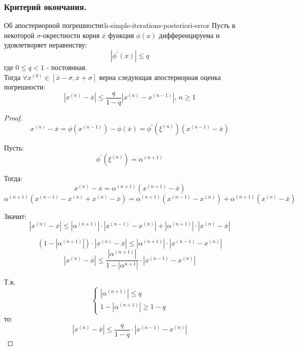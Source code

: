 \documentclass[14pt]{extarticle}
\begin{document}
    \subsubsection{Критерий окончания.}
        
        \begin{theorem}{Об апостериорной погрешности}{th-simple-iterations-posteriori-error}
            Пусть в некоторой $\sigma$-окрестности корня $\overline{x}$ функция $\phi(x)$ дифференцируема и удовлетворяет неравенству:
            $$|\phi^{'}(x)| \leq q$$
            где $0 \leq q < 1$ - постоянная.\\

            Тогда $\forall x^{(0)} \in [\overline{x} - \sigma, \overline{x} + \sigma]$ верна следующая апостериорная оценка погрешности:
            $$|x^{(n)} - \overline{x}| \leq \frac{q}{1 - q} |x^{(n)} - x^{(n - 1)}| \text{, } n \geq 1$$

            \begin{proof}
                $$x^{(n)} - \overline{x} = \phi(x^{(n - 1)}) - \phi(\overline{x}) = \phi^{'}(\xi^{(n)})(x^{(n - 1)} - \overline{x})$$

                Пусть: 
                $$\phi^{'}(\xi^{(n)}) = \alpha^{(n+1)}$$

                Тогда:
                $$x^{(n)} - \overline{x} = \alpha^{(n+1)}(x^{(n+1)} - \overline{x})$$
                $$\alpha^{(n + 1)}(x^{(n - 1)} - x^{(n)} + x^{(n)} - \overline{x}) = \alpha^{(n + 1)}(x^{(n - 1)} - x^{(n)}) + \alpha^{(n + 1)}(x^{(n)} - \overline{x})$$
                
                Значит:
                $$|x^{(n)} - \overline{x}| \leq |\alpha^{(n + 1)}| \cdot |x^{(n - 1)} - x^{(n)}| + |\alpha^{(n + 1)}| \cdot |x^{(n)} - \overline{x}|$$

                $$(1 - |\alpha^{(n + 1)}|) \cdot |x^{(n)} - \overline{x}| \leq |\alpha^{(n + 1)}| \cdot |x^{(n - 1)} - x^{(n)}|$$
                $$|x^{(n)} - \overline{x}| \leq \frac{|\alpha^{(n + 1)}|}{1 - |\alpha^{n + 1}|} \cdot |x^{(n - 1)} - x^{(n)}|$$

                Т.к. $$\begin{cases} 
                       |\alpha^{(n + 1)}| \leq q \\
                       1 - |\alpha^{(n + 1)}| \geq 1 - q
                       \end{cases}$$ то:
                $$|x^{(n)} - \overline{x}| \leq \frac{q}{1-q} \cdot |x^{(n - 1)} - x^{(n)}|$$
            \end{proof}
        \end{theorem}
\end{document}
